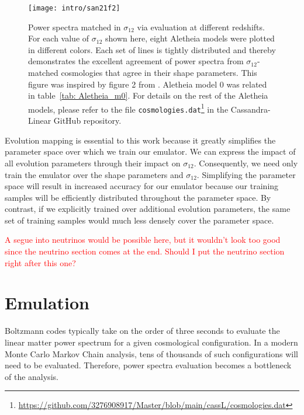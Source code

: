 \begin{figure}[htb]
  \centering
  \texttt{[image: intro/san21f2]}
  \cprotect\caption[Demonstration of evolution mapping]{Power spectra matched
  	in $\sigma_{12}$ via evaluation at different redshifts. For each value of
  	$\sigma_{12}$
  	shown here, eight Aletheia models were plotted in different
  	colors. Each set of lines is tightly distributed and thereby demonstrates 
  	the excellent agreement of power spectra from $\sigma_{12}$-matched
  	cosmologies that agree in their shape parameters. This figure was
  	inspired by figure 2 from \citet{San21}. Aletheia model 0 was related in
  	table~\ref{tab: Aletheia_m0}. For details on the rest of the Aletheia
  	models, please refer to the file
  	\verb|cosmologies.dat|\footnote{\url{https://github.com/3276908917/Master/blob/main/cassL/cosmologies.dat}}
  	in the Cassandra-Linear GitHub repository.}
  \label{fig: ev_mapping_demo}
\end{figure}


Evolution mapping is essential to this work because it greatly simplifies the 
parameter space over which we train our emulator. We can express the impact of
all evolution parameters through their impact on $\sigma_{12}$. Consequently, 
we need only train the emulator over the shape parameters and $\sigma_{12}$.
Simplifying the parameter space will
result in increased accuracy for our emulator because our training samples
will be efficiently distributed throughout the parameter space. By contrast,
if we explicitly trained over additional evolution parameters, the same set of
training samples would much less densely cover the parameter space.

\textcolor{red}{A segue into neutrinos would be possible here, but it
wouldn't look too good since the neutrino section comes at the end. Should I
put the neutrino section right after this one?}



\section{Emulation}
\label{sec: emulation_intro}

Boltzmann codes typically take on the order of three seconds to evaluate the
linear matter power spectrum for a given cosmological configuration. In a
modern Monte Carlo Markov Chain analysis, tens of thousands of such
configurations will need to be evaluated. Therefore, power
spectra evaluation becomes a bottleneck of the analysis.

